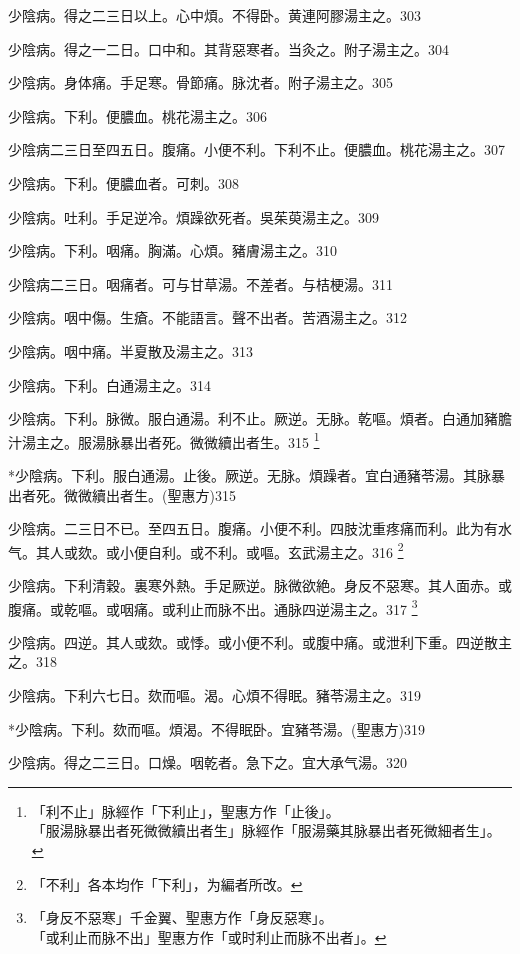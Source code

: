 \documentclass[b5paper,twoside,zihao=-4,UTF8]{ctexbook}
\begin{document}
少陰病。得之二三日以上。心中煩。不得卧。黄連阿膠湯主之。303

少陰病。得之一二日。口中和。其背惡寒者。当灸之。附子湯主之。304

少陰病。身体痛。手足寒。骨節痛。脉沈者。附子湯主之。305

少陰病。下利。便膿血。桃花湯主之。306

少陰病二三日至四五日。腹痛。小便不利。下利不止。便膿血。桃花湯主之。307

少陰病。下利。便膿血者。可刺。308

少陰病。吐利。手足逆{冷}。煩躁欲死者。{吳}茱萸湯主之。309

少陰病。下利。咽痛。胸滿。心煩。豬膚湯主之。310

少陰病二三日。咽痛者。可与甘草湯。不差者。与桔梗湯。311

少陰病。咽中傷。生瘡。不能語言。聲不出者。苦酒湯主之。312

少陰病。咽中痛。半夏散及湯主之。313

少陰病。下利。白通湯主之。314

少陰病。下利。脉微。服白通湯。利不止。厥逆。无脉。乾嘔。煩者。白通加豬膽汁湯主之。服湯脉暴出者死。微{微}續{出}者生。315
	\footnote{「利不止」脉經作「下利止」，聖惠方作「止後」。\\「服湯脉暴出者死微微續出者生」脉經作「服湯藥其脉暴出者死微細者生」。}

*少陰病。下利。服白通湯。止後。厥逆。无脉。煩躁者。宜白通豬苓湯。其脉暴出者死。微微續出者生。(聖惠方)315

少陰病。二三日不已。至四五日。腹痛。小便不利。四肢沈重疼痛而利。此为有水气。其人或欬。或小便{自}利。或不利。或嘔。玄武湯主之。316
	\footnote{「不利」各本均作「下利」，为編者所改。}

少陰病。下利清穀。裏寒外熱。手足厥逆。脉微欲絶。身反不惡寒。其人面赤。或腹痛。或乾嘔。或咽痛。或利止{而}脉不出。通脉四逆湯主之。317
	\footnote{「身反不惡寒」千金翼、聖惠方作「身反惡寒」。\\「或利止而脉不出」聖惠方作「或时利止而脉不出者」。}

少陰病。四逆。其人或欬。或悸。或小便不利。或腹中痛。或泄利下重。四逆散主之。318

少陰病。下利六七日。欬而嘔。渴。心煩不得眠。豬苓湯主之。319

*少陰病。下利。欬而嘔。煩渴。不得眠卧。宜豬苓湯。(聖惠方)319

少陰病。得之二三日。口燥。咽乾者。急下之。宜{大}承气湯。320
\end{document}
